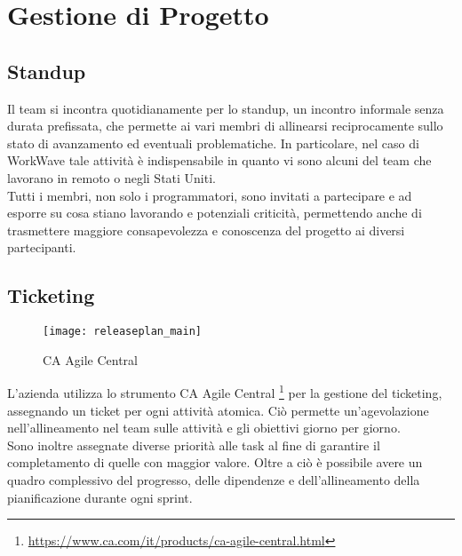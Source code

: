 \section{Gestione di Progetto}

\subsection{Standup}

Il team si incontra quotidianamente per lo standup, un incontro informale senza durata prefissata, che permette ai vari membri di allinearsi reciprocamente sullo stato di avanzamento ed eventuali problematiche. In particolare, nel caso di WorkWave tale attività è indispensabile in quanto vi sono alcuni del team che lavorano in remoto o negli Stati Uniti. \\

Tutti i membri, non solo i programmatori, sono invitati a partecipare e ad esporre su cosa stiano lavorando e potenziali criticità, permettendo anche di trasmettere maggiore consapevolezza e conoscenza del progetto ai diversi partecipanti.

\subsection{Ticketing}

\begin{figure}[H] 
  \centering 
  \texttt{[image: releaseplan\_main]} 
  \caption{CA Agile Central}
\end{figure}

L'azienda utilizza lo strumento CA Agile Central \footnote{ \url{https://www.ca.com/it/products/ca-agile-central.html}} per la gestione del ticketing, assegnando un ticket per ogni attività atomica. Ciò permette un'agevolazione nell'allineamento nel team sulle attività e gli obiettivi giorno per giorno. \\

Sono inoltre assegnate diverse priorità alle task al fine di garantire il completamento di quelle con maggior valore. Oltre a ciò è possibile avere un quadro complessivo del progresso, delle dipendenze e dell'allineamento della pianificazione durante ogni \gls{sprint}.
